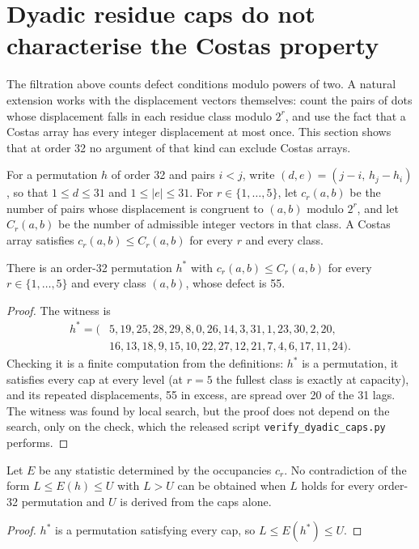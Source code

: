 \section{Dyadic residue caps do not characterise the Costas property}
\label{p7-sec:caps}

The filtration above counts defect conditions modulo powers of two. A natural extension works with the
displacement vectors themselves: count the pairs of dots whose displacement falls in each residue class
modulo $2^r$, and use the fact that a Costas array has every integer displacement at most once. This
section shows that at order 32 no argument of that kind can exclude Costas arrays.

For a permutation $h$ of order 32 and pairs $i<j$, write $(d,e)=(j-i,\,h_j-h_i)$, so that $1\le d\le31$
and $1\le|e|\le31$. For $r\in\{1,\dots,5\}$, let $c_r(a,b)$ be the number of pairs whose displacement is
congruent to $(a,b)$ modulo $2^r$, and let $C_r(a,b)$ be the number of admissible integer vectors in
that class. A Costas array satisfies $c_r(a,b)\le C_r(a,b)$ for every $r$ and every class.

\begin{proposition}
\label{p7-prop:caps}
There is an order-32 permutation $h^\ast$ with $c_r(a,b)\le C_r(a,b)$ for every $r\in\{1,\dots,5\}$ and
every class $(a,b)$, whose defect is 55.
\end{proposition}
\begin{proof}
The witness is
\[
\begin{aligned}
h^\ast=(&5,19,25,28,29,8,0,26,14,3,31,1,23,30,2,20,\\
        &16,13,18,9,15,10,22,27,12,21,7,4,6,17,11,24).
\end{aligned}
\]
Checking it is a finite computation from the definitions: $h^\ast$ is a permutation, it satisfies every
cap at every level (at $r=5$ the fullest class is exactly at capacity), and its repeated displacements,
55 in excess, are spread over 20 of the 31 lags. The witness was found by local search, but the proof
does not depend on the search, only on the check, which the released script
\texttt{verify\_dyadic\_caps.py} performs.
\end{proof}

\begin{corollary}
\label{p7-cor:caps}
Let $E$ be any statistic determined by the occupancies $c_r$. No contradiction of the form
$L\le E(h)\le U$ with $L>U$ can be obtained when $L$ holds for every order-32 permutation and $U$ is
derived from the caps alone.
\end{corollary}
\begin{proof}
$h^\ast$ is a permutation satisfying every cap, so $L\le E(h^\ast)\le U$.
\end{proof}

